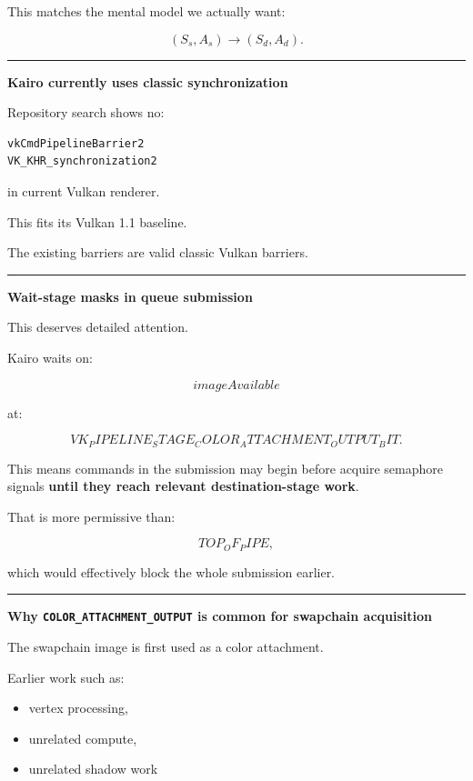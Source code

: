 This matches the mental model we actually want:

\[
(S_s,A_s)\rightarrow(S_d,A_d).
\]

\begin{center}\rule{0.5\linewidth}{0.5pt}\end{center}

\textbf{Kairo currently uses classic synchronization}

Repository search shows no:

\begin{verbatim}
vkCmdPipelineBarrier2
VK_KHR_synchronization2
\end{verbatim}

in current Vulkan renderer.

This fits its Vulkan 1.1 baseline.

The existing barriers are valid classic Vulkan barriers.

\begin{center}\rule{0.5\linewidth}{0.5pt}\end{center}

\textbf{Wait-stage masks in queue submission}

This deserves detailed attention.

Kairo waits on:

\[
imageAvailable
\]

at:

\[
VK_PIPELINE_STAGE_COLOR_ATTACHMENT_OUTPUT_BIT.
\]

This means commands in the submission may begin before acquire semaphore signals \textbf{until they reach relevant destination-stage work}.

That is more permissive than:

\[
TOP_OF_PIPE,
\]

which would effectively block the whole submission earlier.

\begin{center}\rule{0.5\linewidth}{0.5pt}\end{center}

\textbf{Why \texttt{COLOR\_ATTACHMENT\_OUTPUT} is common for swapchain acquisition}

The swapchain image is first used as a color attachment.

Earlier work such as:

\begin{itemize}
\tightlist
\item
  vertex processing,
\item
  unrelated compute,
\item
  unrelated shadow work
\end{itemize}

